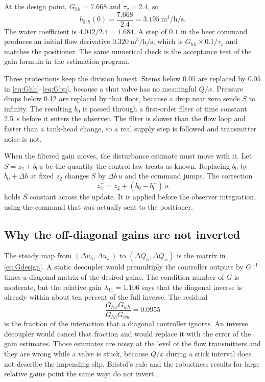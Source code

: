 At the design point, $G_{hh}=7.668$ and $\tau_v=2.4$, so
\begin{equation}
b_{0,h}(0) = \frac{7.668}{2.4} = 3.195\ \si{\cubic\metre\per\hour\per\second}.
\end{equation}
The water coefficient is $4.042/2.4 = 1.684$. A step of $0.1$ in the beer command produces an initial flow derivative $0.320\ \si{\cubic\metre\per\hour\per\second}$, which is $G_{hh}\times 0.1/\tau_v$ and matches the positioner. The same numerical check is the acceptance test of the gain formula in the estimation program.

Three protections keep the division honest. Stems below $0.05$ are replaced by $0.05$ in \eqref{eq:Ghh}--\eqref{eq:Gbp}, because a shut valve has no meaningful $Q/x$. Pressure drops below \SI{0.12}{\barg} are replaced by that floor, because a drop near zero sends $S$ to infinity. The resulting $b_0$ is passed through a first-order filter of time constant \SI{2.5}{s} before it enters the observer. The filter is slower than the flow loop and faster than a tank-head change, so a real supply step is followed and transmitter noise is not.

When the filtered gain moves, the disturbance estimate must move with it. Let $S = z_2 + b_0 u$ be the quantity the control law treats as known. Replacing $b_0$ by $b_0+\Delta b$ at fixed $z_2$ changes $S$ by $\Delta b\, u$ and the command jumps. The correction
\begin{equation}
\label{eq:z2-invariance}
z_2^+ = z_2 + (b_0 - b_0^+)\, u
\end{equation}
holds $S$ constant across the update. It is applied before the observer integration, using the command that was actually sent to the positioner.

\subsection{Why the off-diagonal gains are not inverted}

The steady map from $(\Delta u_h,\Delta u_w)$ to $(\Delta Q_h,\Delta Q_w)$ is the matrix in \eqref{eq:Gdesign}. A static decoupler would premultiply the controller outputs by $G^{-1}$ times a diagonal matrix of the desired gains. The condition number of $G$ is moderate, but the relative gain $\lambda_{11}=1.106$ says that the diagonal inverse is already within about ten percent of the full inverse. The residual
\begin{equation}
\frac{G_{hw}G_{wh}}{G_{hh}G_{ww}} = 0.0955
\end{equation}
is the fraction of the interaction that a diagonal controller ignores. An inverse decoupler would cancel that fraction and would replace it with the error of the gain estimates. Those estimates are noisy at the level of the flow transmitters and they are wrong while a valve is stuck, because $Q/x$ during a stick interval does not describe the impending slip. Bristol's rule and the robustness results for large relative gains point the same way: do not invert \cite{bristol1966rga,skogestad2005multivariable,morari1989robust}.

